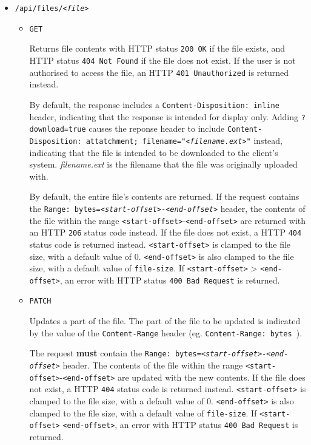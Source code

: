 \documentclass[12pt,a4paper]{report}
\begin{document}
\begin{itemize}
	\item \texttt{/api/files/\textsl{<file>}}

	      \begin{itemize}
		      \item \texttt{GET}

		            Returns file contents with HTTP status \texttt{200 OK} if the file exists, and HTTP status \texttt{404 Not Found} if the file does not exist.
		            If the user is not authorised to access the file, an HTTP \texttt{401 Unauthorized} is returned instead.

		            By default, the response includes a \texttt{Content-Disposition: inline} header, indicating that the response is intended for display only.
		            Adding \texttt{?download=true} causes the reponse header to include \texttt{Content-Disposition: attatchment; filename="\textsl{<filename.ext>}"} instead, indicating that the file is intended to be downloaded to the client's system. \textsl{filename.ext} is the filename that the file was originally uploaded with.

		            By default, the entire file's contents are returned.
		            If the request contains the \texttt{Range: bytes=\textsl{<start-offset>}-\textsl{<end-offset>}} header, the contents of the file within the range \texttt{<start-offset>}-\texttt{<end-offset>} are returned with an HTTP \texttt{206} status code instead.
		            If the file does not exist, a HTTP \texttt{404} status code is returned instead.
		            \texttt{<start-offset>} is clamped to the file size, with a default value of 0.
		            \texttt{<end-offset>} is also clamped to the file size, with a default value of \texttt{file-size}.
		            If \texttt{<start-offset>} > \texttt{<end-offset>}, an error with HTTP status \texttt{400 Bad Request} is returned.

		      \item \texttt{PATCH}

		            Updates a part of the file.
		            The part of the file to be updated is indicated by the value of the \texttt{Content-Range} header (eg. \texttt{Content-Range: bytes }).

		            The request \textbf{must} contain the \texttt{Range: bytes=\textsl{<start-offset>}-\textsl{<end-offset>}} header.
		            The contents of the file within the range \texttt{<start-offset>}-\texttt{<end-offset>} are updated with the new contents.
		            If the file does not exist, a HTTP \texttt{404} status code is returned instead.
		            \texttt{<start-offset>} is clamped to the file size, with a default value of 0.
		            \texttt{<end-offset>} is also clamped to the file size, with a default value of \texttt{file-size}.
		            If \texttt{<start-offset>} \> \texttt{<end-offset>}, an error with HTTP status \texttt{400 Bad Request} is returned.


\end{itemize}
\end{itemize}
\end{document}
